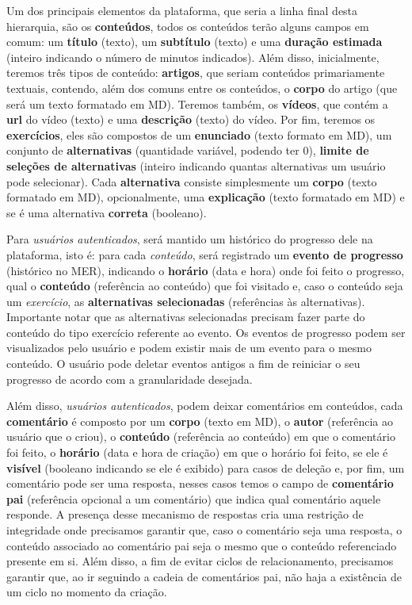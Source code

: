 
Um dos principais elementos da plataforma, que seria a linha final desta
hierarquia, são os \textbf{conteúdos}, todos os conteúdos terão alguns campos
em comum: um \textbf{título} (texto), um \textbf{subtítulo} (texto) e uma
\textbf{duração estimada} (inteiro indicando o número de minutos indicados).
Além disso, inicialmente, teremos três tipos de conteúdo: \textbf{artigos}, que
seriam conteúdos primariamente textuais, contendo, além dos comuns entre os
conteúdos, o \textbf{corpo} do artigo (que será um texto formatado em MD).
Teremos também, os \textbf{vídeos}, que contém a \textbf{url} do vídeo (texto)
e uma \textbf{descrição} (texto) do vídeo. Por fim, teremos os
\textbf{exercícios}, eles são compostos de um \textbf{enunciado} (texto formato
em MD), um conjunto de \textbf{alternativas} (quantidade variável, podendo ter
0), \textbf{limite de seleções de alternativas} (inteiro indicando quantas
alternativas um usuário pode selecionar). Cada \textbf{alternativa} consiste
simplesmente um \textbf{corpo} (texto formatado em MD), opcionalmente, uma
\textbf{explicação} (texto formatado em MD) e se é uma alternativa
\textbf{correta} (booleano).


Para \textit{usuários autenticados}, será mantido um histórico do progresso
dele na plataforma, isto é: para cada \textit{conteúdo}, será registrado um
\textbf{evento de progresso} (histórico no MER), indicando o \textbf{horário}
(data e hora) onde foi feito o progresso, qual o \textbf{conteúdo} (referência
ao conteúdo) que foi visitado e, caso o conteúdo seja um \textit{exercício}, as
\textbf{alternativas selecionadas} (referências às alternativas). Importante
notar que as alternativas selecionadas precisam fazer parte do conteúdo do tipo
exercício referente ao evento. Os eventos de progresso podem ser visualizados
pelo usuário e podem existir mais de um evento para o mesmo conteúdo. O usuário
pode deletar eventos antigos a fim de reiniciar o seu progresso de acordo com a
granularidade desejada.


Além disso, \textit{usuários autenticados}, podem deixar comentários em
conteúdos, cada \textbf{comentário} é composto por um \textbf{corpo} (texto em
MD), o \textbf{autor} (referência ao usuário que o criou), o \textbf{conteúdo}
(referência ao conteúdo) em que o comentário foi feito, o \textbf{horário}
(data e hora de criação) em que o horário foi feito, se ele é \textbf{visível}
(booleano indicando se ele é exibido) para casos de deleção e, por fim, um
comentário pode ser uma resposta, nesses casos temos o campo de
\textbf{comentário pai} (referência opcional a um comentário) que indica qual
comentário aquele responde. A presença desse mecanismo de respostas cria uma
restrição de integridade onde precisamos garantir que, caso o comentário seja
uma resposta, o conteúdo associado ao comentário pai seja o mesmo que o
conteúdo referenciado presente em si. Além disso, a fim de evitar ciclos de
relacionamento, precisamos garantir que, ao ir seguindo a cadeia de comentários
pai, não haja a existência de um ciclo no momento da criação.

